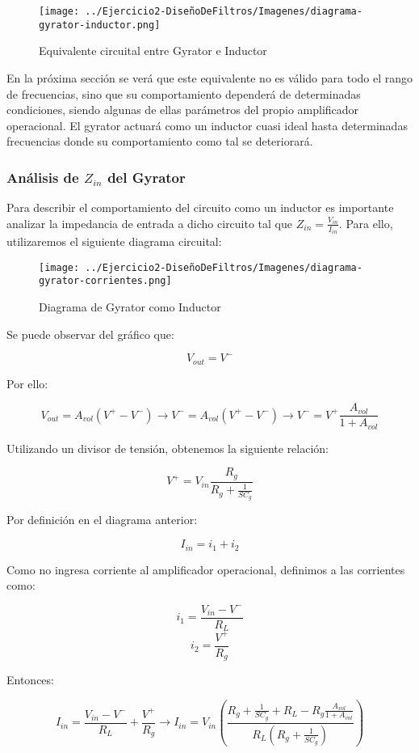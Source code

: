 \begin{figure}[H]
    \centering
    \texttt{[image: ../Ejercicio2-DiseñoDeFiltros/Imagenes/diagrama-gyrator-inductor.png]}
    \caption{Equivalente circuital entre Gyrator e Inductor}
\end{figure}

En la próxima sección se verá que este equivalente no es válido para todo el rango de frecuencias, sino que su comportamiento dependerá de 
determinadas condiciones, siendo algunas de ellas parámetros del propio amplificador operacional. 
El gyrator actuará como un inductor cuasi ideal hasta determinadas frecuencias donde su comportamiento 
como tal se deteriorará. 

\subsubsection{Análisis de $Z_{in}$ del Gyrator}

Para describir el comportamiento del circuito como un inductor es importante 
analizar la impedancia de entrada a dicho circuito tal que $Z_{in}=\frac{V_{in}}{I_{in}}$. 
Para ello, utilizaremos el siguiente diagrama circuital:

\begin{figure}[H]
    \centering
    \texttt{[image: ../Ejercicio2-DiseñoDeFiltros/Imagenes/diagrama-gyrator-corrientes.png]}
    \caption{Diagrama de Gyrator como Inductor}
\end{figure}

Se puede observar del gráfico que:

$$V_{out}=V^-$$

Por ello:

$$V_{out}=A_{vol}(V^+-V^-) \longrightarrow V^-=A_{vol}(V^+-V^-) 
\longrightarrow V^-= V^+ \frac{A_{vol}}{1+A_{vol}}$$

Utilizando un divisor de tensión, obtenemos la siguiente relación:

$$V^+= V_{in}\frac{R_g}{R_g+\frac{1}{SC_g}}$$

Por definición en el diagrama anterior:

$$I_{in}=i_1+i_2$$

Como no ingresa corriente al amplificador operacional, definimos a las corrientes como:

$$i_1=\frac{V_{in}-V^-}{R_L}$$
$$i_2=\frac{V^+}{R_g}$$

Entonces:

$$I_{in}=\frac{V_{in}-V^-}{R_L}+\frac{V^+}{R_g} \longrightarrow 
I_{in}=V_{in}(\frac{R_g+\frac{1}{SC_g}+R_L-R_g\frac{A_{vol}}{1+A_{vol}}}{R_L(R_g+\frac{1}{SC_g})})$$

